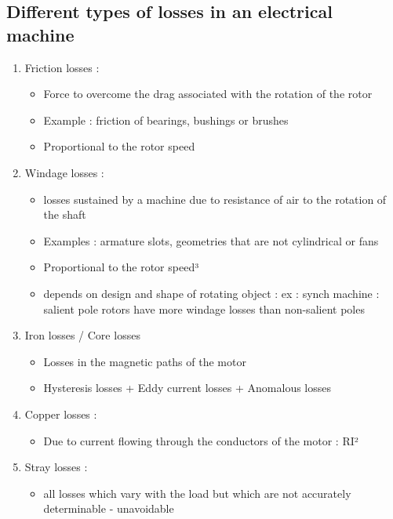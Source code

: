 \subsection{Different types of losses in an electrical machine}
\begin{enumerate}
    \item Friction losses :
    \begin{itemize}
        \item Force to overcome the drag associated with the rotation of the rotor
        \item Example : friction of bearings, bushings or brushes
        \item Proportional to the rotor speed
    \end{itemize}
    \item Windage losses :
    \begin{itemize}
        \item losses sustained by a machine due to resistance of air to the rotation of the shaft
        \item Examples : armature slots, geometries that are not cylindrical or fans
        \item Proportional to the rotor speed³
        \item 	depends on design and shape of rotating object : ex : synch machine : salient pole rotors have more windage losses than non-salient poles
    \end{itemize}
    \item Iron losses / Core losses
        \begin{itemize}
        \item Losses in the magnetic paths of the motor
        \item Hysteresis losses + Eddy current losses + Anomalous losses
    \end{itemize}
    \item Copper losses : 
        \begin{itemize}
        \item Due to current flowing through the conductors of the motor : RI²
    \end{itemize}
    \item Stray losses : 
        \begin{itemize}
        \item all losses which vary with the load but which are not accurately determinable - unavoidable
    \end{itemize}
\end{enumerate}


